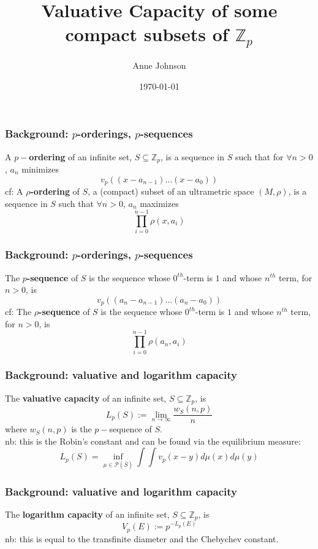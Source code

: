 \documentclass{beamer}
\title{Valuative Capacity of some compact subsets of $\mathbb{Z}_p$}
\author{Anne Johnson}
\date{\today}
\theoremstyle{definition}
\begin{document}
\maketitle

\begin{frame}
\frametitle{Background: $p$-orderings, $p$-sequences}
A \textbf{$p-$ordering} of an infinite set, $S \subseteq \mathbb{Z}_p$, is a sequence in $S$ such that for $\forall n > 0$, $a_n$ minimizes
\[v_p((x - a_{n-1}) \ldots (x - a_0))\] 
\pause \newline
cf: A \textbf{$\rho$-ordering} of $S$, a (compact) subset of an ultrametric space $(M, \rho)$,  is a sequence in $S$ such that $\forall n > 0$, $a_n$ maximizes 
\[\prod_{i=0}^{n-1} \rho(x,a_i)\] 
\end{frame}

\begin{frame}
\frametitle{Background: $p$-orderings, $p$-sequences}

 The \textbf{$p$-sequence} of $S$ is the sequence whose $0^{th}$-term is $1$ and whose $n^{th}$ term, for $n >0$, is 
\[v_p ((a_n-a_{n-1}) \ldots (a_n - a_0))\]
\pause \newline
cf:  The \textbf{$\rho$-sequence} of $S$ is the sequence whose $0^{th}$-term is $1$ and whose $n^{th}$ term, for $n >0$, is
\[\prod_{i=0}^{n-1} \rho(a_n,a_i)\]

\end{frame}


\begin{frame}
\frametitle{Background: valuative and logarithm capacity}
 The \textbf{valuative capacity} of an infinite set, $S \subseteq \mathbb{Z}_p$, is
\[ L_p(S) := \lim_{n\to\infty}  \frac{w_S(n,p)}{n}\]
where $w_S(n,p)$ is the $p-$sequence of $S$. 
\newline
\pause
\\nb: this is the Robin's constant and can be found via the equilibrium measure:
 \[L_p(S) = \inf_{\mu\in\mathcal{P}(\bar{S}) } \int \int v_p(x-y)d\mu(x)d\mu(y)\]
\end{frame}

\begin{frame}
\frametitle{Background: valuative and logarithm capacity}
 The \textbf{logarithm capacity} of an infinite set, $S \subseteq \mathbb{Z}_p$, is
\[ V_p(E) := p^{-L_p(E)}\]
\newline
nb: this is equal to the transfinite diameter and the Chebychev constant.
\pause \newline
\end{frame}
\end{document}
